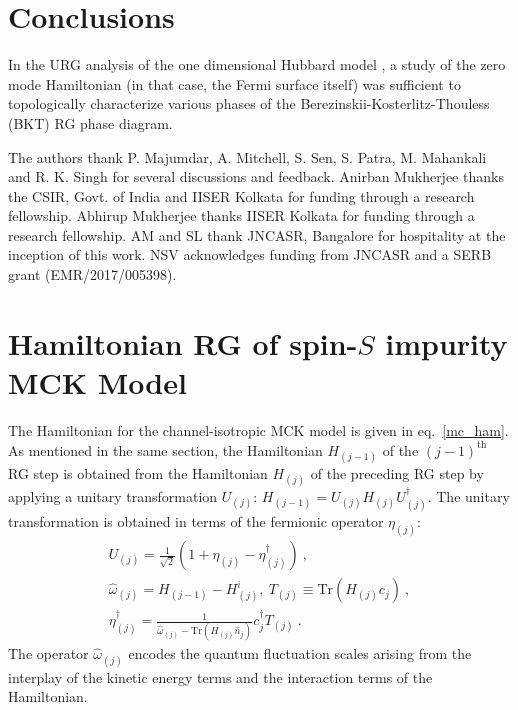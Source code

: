 \documentclass[reprint,prb,superscriptaddress]{revtex4-2}
\begin{document}
\section{Conclusions}
In the URG analysis of the one dimensional Hubbard model \cite{1dhubjhep}, a study of the zero mode Hamiltonian (in that case, the Fermi surface itself) was sufficient to topologically characterize various phases of the Berezinskii-Kosterlitz-Thouless (BKT) RG phase diagram. 


\acknowledgments
The authors thank P. Majumdar, A. Mitchell, S. Sen, S. Patra, M. Mahankali and R. K. Singh for several discussions and feedback. Anirban Mukherjee thanks the CSIR, Govt. of India and IISER Kolkata for funding through a research fellowship. Abhirup Mukherjee thanks IISER Kolkata for funding through a research fellowship. AM and SL thank JNCASR, Bangalore for hospitality at the inception of this work. NSV acknowledges funding from JNCASR and a SERB grant (EMR/2017/005398).

\appendix
\section{Hamiltonian RG of spin-\(S\) impurity MCK Model}
\label{appendix_urg}
The Hamiltonian for the channel-isotropic MCK model is given in eq.~\ref{mc_ham}. As mentioned in the same section, the Hamiltonian \(H_{(j-1)}\) of the \((j-1)^\text{th}\) RG step is obtained from the Hamiltonian \(H_{(j)}\) of the preceding RG step by applying a unitary transformation \(U_{(j)}\): \(H_{(j-1)} = U_{(j)} H_{(j)} U^\dagger_{(j)}\). The unitary transformation is obtained in terms of the fermionic operator \(\eta_{(j)}\):
\begin{gather}
	U_{(j)} = \frac{1}{\sqrt 2}\left(1 + \eta_{(j)} - \eta_{(j)}^\dagger\right)~, \\
	\hat \omega_{(j)} = H_{(j-1)} - H^i_{(j)},~T_{(j)} \equiv \text{Tr}\left(H_{(j)}c_{j}\right)~,\\
	\eta^\dagger_{(j)} = \frac{1}{\hat \omega_{(j)} - \text{Tr}\left(H_{(j)} \hat n_{j}\right) } c^\dagger_{j} T_{(j)}~.
\end{gather}
The operator \(\hat \omega_{(j)}\) encodes the quantum fluctuation scales arising from the interplay of the kinetic energy terms and the interaction terms of the Hamiltonian.
\end{document}
